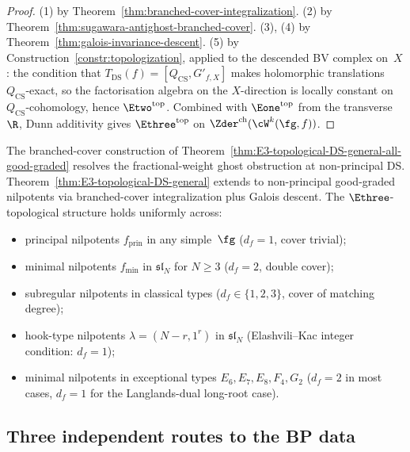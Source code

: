 \begin{proof}
(1) by Theorem~\ref{thm:branched-cover-integralization}.
(2) by Theorem~\ref{thm:sugawara-antighost-branched-cover}.
(3), (4) by Theorem~\ref{thm:galois-invariance-descent}.
(5) by Construction~\ref{constr:topologization}, applied to the
descended BV complex on~$X$: the condition that
$T_{\mathrm{DS}}(f) = [Q_{\mathrm{CS}}, G'_{f, X}]$ makes
holomorphic translations $Q_{\mathrm{CS}}$-exact, so the
factorisation algebra on the $X$-direction is locally constant on
$Q_{\mathrm{CS}}$-cohomology, hence $\Etwo^{\mathrm{top}}$. Combined
with $\Eone^{\mathrm{top}}$ from the transverse~$\R$, Dunn
additivity gives $\Ethree^{\mathrm{top}}$ on
$\Zder^{\mathrm{ch}}(\cW^{k}(\fg, f))$.
\end{proof}

\begin{corollary}
\label{cor:fractional-ghost-healed-non-principal}
\ClaimStatusProvedHere{}

The branched-cover construction of
Theorem~\ref{thm:E3-topological-DS-general-all-good-graded} resolves
the fractional-weight ghost obstruction at non-principal DS.
Theorem~\ref{thm:E3-topological-DS-general} extends to non-principal
good-graded nilpotents via branched-cover integralization plus Galois
descent. The $\Ethree$-topological structure holds uniformly across:
\begin{itemize}[nosep]
\item principal nilpotents $f_{\mathrm{prin}}$ in any simple~$\fg$
 \textup{(}$d_{f} = 1$, cover trivial\textup{)};
\item minimal nilpotents $f_{\min}$ in $\mathfrak{sl}_{N}$ for
 $N \ge 3$ \textup{(}$d_{f} = 2$, double cover\textup{)};
\item subregular nilpotents in classical types
 \textup{(}$d_{f} \in \{1, 2, 3\}$, cover of matching
 degree\textup{)};
\item hook-type nilpotents $\lambda = (N{-}r, 1^{r})$ in
 $\mathfrak{sl}_{N}$ \textup{(}Elashvili--Kac integer
 condition: $d_{f} = 1$\textup{)};
\item minimal nilpotents in exceptional types $E_{6}, E_{7}, E_{8},
 F_{4}, G_{2}$ \textup{(}$d_{f} = 2$ in most cases, $d_{f} = 1$
 for the Langlands-dual long-root case\textup{)}.
\end{itemize}
\end{corollary}

\subsection{Three independent routes to the BP data}
\label{subsec:three-lane}

